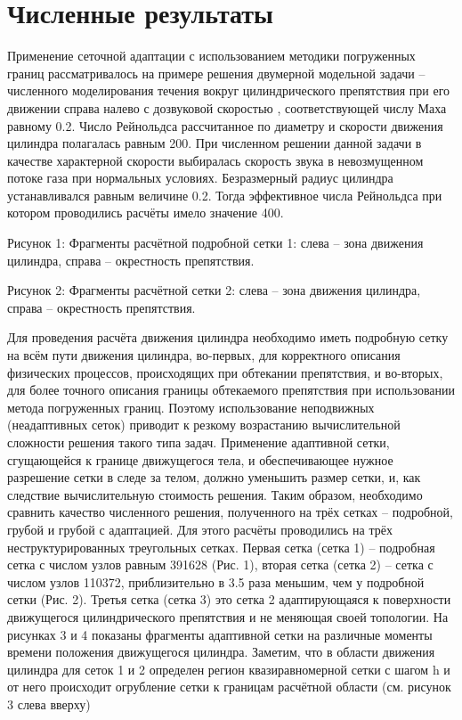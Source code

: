 \chapter{Численные результаты} \label{ch:ch3}

Применение сеточной адаптации с использованием методики погруженных границ рассматривалось на примере решения двумерной модельной задачи – численного моделирования течения вокруг цилиндрического препятствия при его движении справа налево с дозвуковой скоростью  , соответствующей числу Маха равному 0.2. Число Рейнольдса   рассчитанное по диаметру и скорости движения цилиндра полагалась равным 200. При численном решении данной задачи в качестве характерной скорости выбиралась скорость звука в невозмущенном потоке газа при нормальных условиях. Безразмерный радиус цилиндра   устанавливался равным величине 0.2. Тогда эффективное числа Рейнольдса   при котором проводились расчёты имело значение 400.

Рисунок 1: Фрагменты расчётной подробной сетки 1: слева – зона движения цилиндра, справа – окрестность препятствия.


Рисунок 2: Фрагменты расчётной сетки 2: слева – зона движения цилиндра, справа – окрестность препятствия.

Для проведения расчёта движения цилиндра необходимо иметь подробную сетку на всём пути движения цилиндра, во-первых, для корректного описания физических процессов, происходящих при обтекании препятствия, и во-вторых, для более точного описания границы обтекаемого препятствия при использовании метода погруженных границ. Поэтому использование неподвижных (неадаптивных сеток) приводит к резкому возрастанию вычислительной сложности решения такого типа задач. Применение адаптивной сетки, сгущающейся к границе движущегося тела, и обеспечивающее нужное разрешение сетки в следе за телом, должно уменьшить размер сетки, и, как следствие вычислительную стоимость решения. Таким образом, необходимо сравнить качество численного решения, полученного на трёх сетках – подробной, грубой и грубой с адаптацией.
Для этого расчёты проводились на трёх неструктурированных треугольных сетках. Первая сетка (сетка 1) – подробная сетка с числом узлов равным 391628 (Рис. 1), вторая сетка (сетка 2) – сетка с числом узлов 110372, приблизительно в 3.5 раза меньшим, чем у подробной сетки (Рис. 2). Третья сетка (сетка 3) это сетка 2 адаптирующаяся к поверхности движущегося цилиндрического препятствия и не меняющая своей топологии. На рисунках 3 и 4 показаны фрагменты адаптивной сетки на различные моменты времени положения движущегося цилиндра. Заметим, что в области движения цилиндра для сеток 1 и 2 определен регион квазиравномерной сетки с шагом h  и от него происходит огрубление сетки к границам расчётной области (см. рисунок 3 слева вверху)


